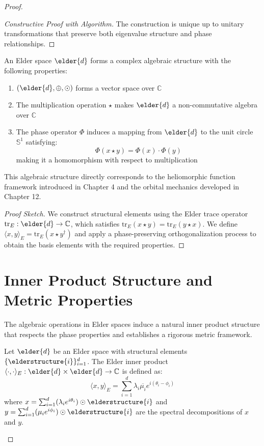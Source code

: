 \begin{proof}
\begin{proof}[Constructive Proof with Algorithm]
The construction is unique up to unitary transformations that preserve both eigenvalue structure and phase relationships.
\end{proof}

\begin{corollary}
An Elder space $\elder{d}$ forms a complex algebraic structure with the following properties:
\begin{enumerate}
    \item $(\elder{d}, \oplus, \odot)$ forms a vector space over $\mathbb{C}$
    \item The multiplication operation $\star$ makes $\elder{d}$ a non-commutative algebra over $\mathbb{C}$
    \item The phase operator $\Phi$ induces a mapping from $\elder{d}$ to the unit circle $\mathbb{S}^1$ satisfying:
    \begin{equation}
        \Phi(x \star y) = \Phi(x) \cdot \Phi(y)
    \end{equation}
    making it a homomorphism with respect to multiplication
\end{enumerate}
This algebraic structure directly corresponds to the heliomorphic function framework introduced in Chapter 4 and the orbital mechanics developed in Chapter 12.
\end{corollary}

\begin{proof}[Proof Sketch]
We construct structural elements using the Elder trace operator $\mathrm{tr}_E: \elder{d} \rightarrow \mathbb{C}$, which satisfies $\mathrm{tr}_E(x \star y) = \mathrm{tr}_E(y \star x)$. We define $\langle x, y \rangle_E = \mathrm{tr}_E(x \star y^{\dagger})$ and apply a phase-preserving orthogonalization process to obtain the basis elements with the required properties.
\end{proof}

\section{Inner Product Structure and Metric Properties}

The algebraic operations in Elder spaces induce a natural inner product structure that respects the phase properties and establishes a rigorous metric framework.

\begin{definition}
Let $\elder{d}$ be an Elder space with structural elements $\{\elderstructure{i}\}_{i=1}^d$. The Elder inner product $\langle \cdot, \cdot \rangle_E: \elder{d} \times \elder{d} \rightarrow \mathbb{C}$ is defined as:
\begin{equation}
\langle x, y \rangle_E = \sum_{i=1}^d \lambda_i \overline{\mu_i} e^{i(\theta_i - \phi_i)}
\end{equation}
where $x = \sum_{i=1}^{d} (\lambda_i e^{i\theta_i}) \odot \elderstructure{i}$ and $y = \sum_{i=1}^{d} (\mu_i e^{i\phi_i}) \odot \elderstructure{i}$ are the spectral decompositions of $x$ and $y$.


\end{definition}
\end{proof}
